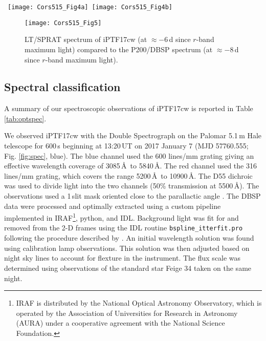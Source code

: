 \documentclass[twocolumn]{emulateapj}
\begin{document}
\begin{figure*}
\begin{center}
\hbox{
\hspace{-0.4cm}
\texttt{[image: Cors515\_Fig4a]}
\hspace{-1cm}
\texttt{[image: Cors515\_Fig4b]}}
\caption{Left:  iPTF17cw spectra (blue for P200/DBSP, $\approx -8$\,d since $r$- and $g$-band maximum light; green for DCT, $\approx +17$\,d since $r$- and $g$-band maximum light; red for Keck/LRIS, $\approx +43$\,d since $r$- and $g$-band maximum light), corrected for redshift effects assuming $z=0.093$. Right: same iPTF spectra as in the left panel, but binned and galaxy template subtracted, compared to de-reddened SN\,1998bw spectra at various phases (see text for discussion). \label{fig:spec}}
\end{center}
\end{figure*}

\begin{figure}
\begin{center}
\hspace{-0.5cm}
\texttt{[image: Cors515\_Fig5]}
\caption{LT/SPRAT spectrum of iPTF17cw (at $\approx -6$\,d since $r$-band maximum light) compared to the P200/DBSP spectrum (at $\approx -8$\,d since $r$-band maximum light).  \label{fig:LT}}
\end{center}
\end{figure}


\subsection{Spectral classification}
\label{Spectralclassification}
A summary of our spectroscopic observations of iPTF17cw is reported in Table \ref{tab:optspec}. 

We observed iPTF17cw with the Double Spectrograph \citep[DBSP;][]{Oke1982} on the
Palomar 5.1\,m Hale telescope for 600\,s beginning at 13:20\,UT on
2017 January 7 (MJD 57760.555; Fig. \ref{fig:spec}, blue). The blue channel used the 600 lines/mm grating
giving an effective wavelength coverage of 3085\,\AA\ to 5840\,\AA. 
The red channel used the 316 lines/mm grating, which
covers the range 5200\,\AA\ to 10900\,\AA. The D55 dichroic was used
to divide light into the two channels (50\% transmission at 5500\,\AA). 
The observations used a 1\,\arcsec slit mask oriented close to the
parallactic angle \citep{f82}. The DBSP data were processed and optimally extracted using a custom
pipeline implemented in IRAF\footnote{IRAF is distributed by the National Optical Astronomy
Observatory, which is operated by the Association of Universities for
Research in Astronomy (AURA) under a cooperative agreement with the
National Science Foundation.}, python,
and IDL. Background light was fit for and removed from the 2-D frames
using the IDL routine {\tt bspline\_itterfit.pro} following the
procedure described by \citet{kelson2003}. An initial wavelength
solution was found using calibration lamp observations. This solution
was then adjusted based on night sky lines to account for flexture in
the instrument. The flux scale was determined using observations of
the standard star Feige 34 taken on the same night.
\end{document}
